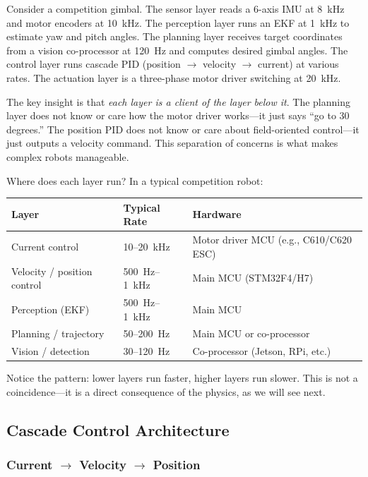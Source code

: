 Consider a competition gimbal. The sensor layer reads a 6-axis IMU at 8~kHz and motor encoders at 10~kHz. The perception layer runs an EKF at 1~kHz to estimate yaw and pitch angles. The planning layer receives target coordinates from a vision co-processor at 120~Hz and computes desired gimbal angles. The control layer runs cascade PID (position $\to$ velocity $\to$ current) at various rates. The actuation layer is a three-phase motor driver switching at 20~kHz.

The key insight is that \textit{each layer is a client of the layer below it}. The planning layer does not know or care how the motor driver works---it just says ``go to 30 degrees.'' The position PID does not know or care about field-oriented control---it just outputs a velocity command. This separation of concerns is what makes complex robots manageable.

Where does each layer run? In a typical competition robot:

\begin{center}
\begin{tabular}{l l l}
\hline
\textbf{Layer} & \textbf{Typical Rate} & \textbf{Hardware} \\
\hline
Current control & 10--20~kHz & Motor driver MCU (e.g., C610/C620 ESC) \\
Velocity / position control & 500~Hz--1~kHz & Main MCU (STM32F4/H7) \\
Perception (EKF) & 500~Hz--1~kHz & Main MCU \\
Planning / trajectory & 50--200~Hz & Main MCU or co-processor \\
Vision / detection & 30--120~Hz & Co-processor (Jetson, RPi, etc.) \\
\hline
\end{tabular}
\end{center}

Notice the pattern: lower layers run faster, higher layers run slower. This is not a coincidence---it is a direct consequence of the physics, as we will see next.

\subsection{Cascade Control Architecture}

\subsubsection{Current $\to$ Velocity $\to$ Position}

